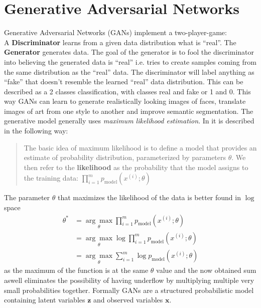\section{Generative Adversarial Networks}
Generative Adversarial Networks (GANs) implement a two-player-game:\\
A \textbf{Discriminator} learns from a given data distribution what is ``real''. The \textbf{Generator} generates data. The goal of the generator is to fool the discriminator into believing the generated data is ``real'' i.e. tries to create samples coming from the same distribution as the ``real'' data. The discriminator will label anything as ``fake'' that doesn't resemble the learned ``real'' data distribution. This can be described as a 2 classes classification, with classes real and fake or 1 and 0. This way GANs can learn to generate realistically looking images of faces, translate images of art from one style to another and improve semantic segmentation.
The generative model generally uses \textit{maximum likelihood estimation}. In \cite{DBLP:journals/corr/Goodfellow17} it is described in the following way:
\begin{quote}
	The basic idea of maximum likelihood is to define a model that provides an estimate of probability distribution, parameterized by parameters $\theta$. We then refer to the \textbf{likelihood} as the probability that the model assigns to the training data: $\prod_{i=1}^{m}p_{\text{model}}(x^{(i)}; \theta)$
\end{quote}
The parameter $\theta$ that maximizes the likelihood of the data is better found in $\log$ space
\begin{align}
	\theta^* &= \underset{\theta}{\arg \max} \prod_{i = 1}^{m} p_{\text{model}} (x^{(i)}; \theta)\\
	&= \underset{\theta}{\arg \max} \log \prod_{i=1}^{m} p_{\text{model}}(x^{(i)}; \theta)\\
	&= \underset{\theta}{\arg \max} \sum_{i = 1}^{m} \log p_{\text{model}}(x^{(i)}; \theta)
\end{align}
as the maximum of the function is at the same $\theta$ value and the now obtained sum aswell eliminates the possibility of having underflow by multiplying multiple very small probabilities together.
Formally GANs are a structured probabilistic model containing latent variables $\mathbf{z}$ and observed variables $\mathbf{x}$.
